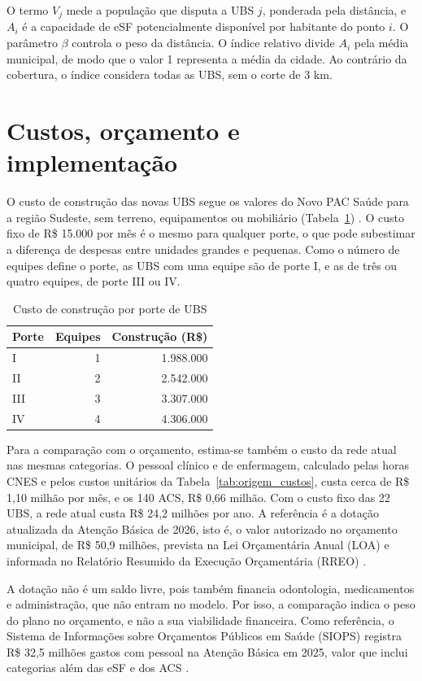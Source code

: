 O termo $V_j$ mede a população que disputa a UBS $j$, ponderada pela distância, e $A_i$ é a capacidade de
eSF potencialmente disponível por habitante do ponto $i$. O parâmetro $\beta$ controla o peso da
distância. O índice relativo divide $A_i$ pela média municipal, de modo que o valor 1 representa a média
da cidade. Ao contrário da cobertura, o índice considera todas as UBS, sem o corte de 3 km.

\section{Custos, orçamento e implementação}
O custo de construção das novas UBS segue os valores do Novo PAC Saúde para a região Sudeste, sem
terreno, equipamentos ou mobiliário (Tabela~\ref{tab:portes}) \citep{novopac2025}. O custo fixo de R\$ 15.000 por mês é o
mesmo para qualquer porte, o que pode subestimar a diferença de despesas entre unidades grandes e
pequenas. Como o número de equipes define o porte, as UBS com uma equipe são de porte I, e as de três ou
quatro equipes, de porte III ou IV.

\begin{table}[htbp]\centering
\caption{Custo de construção por porte de UBS}\label{tab:portes}
\begin{tabular}{lrr}\toprule Porte & Equipes & Construção (R\$)\\\midrule
I & 1 & 1.988.000\\II & 2 & 2.542.000\\III & 3 & 3.307.000\\IV & 4 & 4.306.000\\\bottomrule
\end{tabular}
\end{table}

Para a comparação com o orçamento, estima-se também o custo da rede atual nas mesmas categorias. O
pessoal clínico e de enfermagem, calculado pelas horas CNES e pelos custos unitários da
Tabela~\ref{tab:origem_custos}, custa cerca de R\$ 1,10 milhão por mês, e os 140 ACS, R\$ 0,66 milhão.
Com o custo fixo das 22 UBS, a rede atual custa R\$ 24,2 milhões por ano. A referência é a dotação
atualizada da Atenção Básica de 2026, isto é, o valor autorizado no orçamento municipal, de
R\$ 50,9 milhões, prevista na Lei Orçamentária Anual (LOA) e informada no Relatório Resumido da Execução
Orçamentária (RREO) \citep{itauna2025,tesouro2026}.

A dotação não é um saldo livre, pois também financia odontologia, medicamentos e administração, que não
entram no modelo. Por isso, a comparação indica o peso do plano no orçamento, e não a sua viabilidade
financeira. Como referência, o Sistema de Informações sobre Orçamentos Públicos em Saúde (SIOPS) registra
R\$ 32,5 milhões gastos com pessoal na Atenção Básica em 2025, valor que inclui categorias além das eSF e
dos ACS \citep{siops}.

